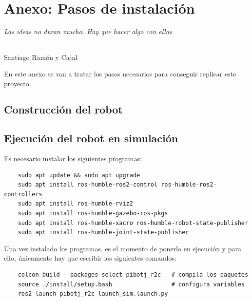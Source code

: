\chapter*{Anexo: Pasos de instalación}
\label{cap:capitulo9}

\begin{flushright}
\begin{minipage}[]{10cm}
\emph{Las ideas no duran mucho. Hay que hacer algo con ellas}\\
\end{minipage}\\

Santiago Ramón y Cajal\\
\end{flushright}

\vspace{1cm}

En este anexo se van a tratar los pasos necesarios para conseguir replicar este proyecto.

\section*{Construcción del robot} 
\label{subsec:anexoconstruccion}



\section*{Ejecución del robot en simulación}
\label{subsec:anexosimulacion}

Es necesario instalar los siguientes programas: 

\begin{verbatim}
	sudo apt update && sudo apt upgrade
	sudo apt install ros-humble-ros2-control ros-humble-ros2-controllers
	sudo apt install ros-humble-rviz2
	sudo apt install ros-humble-gazebo-ros-pkgs
	sudo apt install ros-humble-xacro ros-humble-robot-state-publisher 
	sudo apt install ros-humble-joint-state-publisher
\end{verbatim}
 
Una vez instalado los programas, es el momento de ponerlo en ejecución y para ello, únicamente hay que escribir los siguientes comandos:
\begin{verbatim}
	colcon build --packages-select pibotj_r2c   # compila los paquetes
	source ./install/setup.bash                 # configura variables 
	ros2 launch pibotj_r2c launch_sim.launch.py
\end{verbatim} 

